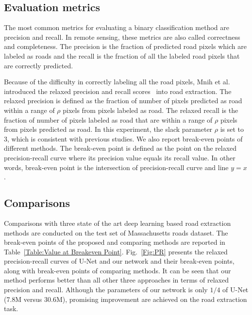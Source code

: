 \documentclass[journal]{IEEEtran}
\begin{document}
\subsection{Evaluation metrics}
The most common metrics for evaluating a binary classification method are precision and recall. In remote sensing, these metrics are also called correctness and completeness. The precision is the fraction of predicted road pixels which are labeled as roads and the recall is the fraction of all the labeled road pixels that are correctly predicted.

Because of the difficulty in correctly labeling all the road pixels, Mnih et al.~\cite{mnih2010learning} introduced the relaxed precision and recall scores~\cite{Ehrig2005Relaxed} into road extraction. The relaxed precision is defined as the fraction of number of pixels predicted as road within a range of $\rho$ pixels from pixels labeled as road. The relaxed recall is the fraction of number of pixels labeled as road that are within a range of $\rho$ pixels from pixels predicted as road. In this experiment, the slack parameter $\rho$ is set to 3, which is consistent with previous studies\cite{mnih2010learning,Saito2016Multiple}. We also report break-even points of different methods. The break-even point is defined as the point on the relaxed precision-recall curve where its precision value equals its recall value. In other words, break-even point is the intersection of precision-recall curve and line $y=x$. 

\subsection{Comparisons}
Comparisons with three state of the art deep learning based road extraction methods are conducted on the test set of Massachusetts roads dataset. The break-even points of the proposed and comparing methods are reported in Table~\ref{Table:Value at Breakeven Point}. Fig.~\ref{Fig:PR} presents the relaxed precision-recall curves of U-Net and our network and their break-even points, along with break-even points of comparing methods. It can be seen that our method performs better than all other three approaches in terms of relaxed precision and recall. Although the parameters of our network is only $1/4$ of U-Net (7.8M versus 30.6M), promising improvement are achieved on the road extraction task. 
\end{document}
